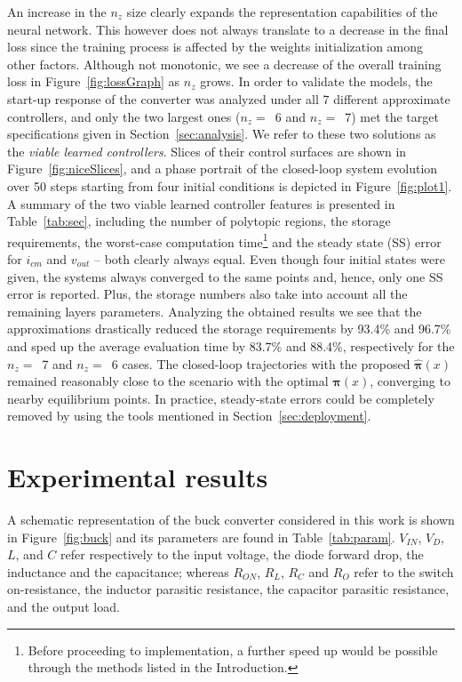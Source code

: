 An increase in the $n_z$ size clearly expands the representation capabilities of the neural network. This however does not always translate to a decrease in the final loss since the training process is affected by the weights initialization among other factors. Although not monotonic, we see a decrease of the overall training loss in Figure~\ref{fig:lossGraph} as $n_z$ grows. In order to validate the models, the start-up response of the converter was analyzed under all 7 different approximate controllers, and only the two largest ones ($n_z=$~6 and $n_z=$~7) met the target specifications given in Section~\ref{sec:analysis}. We refer to these two solutions as the \textit{viable learned controllers}. Slices of their control surfaces are shown in Figure~\ref{fig:niceSlices}, and a phase portrait of the closed-loop system evolution over 50 steps starting from four initial conditions is depicted in Figure~\ref{fig:plot1}. A summary of the two viable learned controller features is presented in Table~\ref{tab:sec}, including the number of polytopic regions, the storage requirements, the worst-case computation time\footnote{Before proceeding to implementation, a further speed up would be possible through the methods listed in the Introduction.} and the steady state (SS) error for $i_{cm}$ and $v_{out}$ -- both clearly always equal. Even though four initial states were given, the systems always converged to the same points and, hence, only one SS error is reported. Plus, the storage numbers also take into account all the remaining layers parameters. Analyzing the obtained results we see that the approximations drastically reduced the storage requirements by 93.4\% and 96.7\% and sped up the average evaluation time by 83.7\% and 88.4\%, respectively for the $n_z=$~7 and $n_z=$~6 cases. The closed-loop trajectories with the proposed $\hat{\bm{\pi}}(x)$ remained reasonably close to the scenario with the optimal $\bm{\pi}(x)$, converging to nearby equilibrium points. In practice, steady-state errors could be completely removed by using the tools mentioned in Section~\ref{sec:deployment}.

\section{Experimental results}


A schematic representation of the buck converter considered in this work is shown in Figure~\ref{fig:buck} and its parameters are found in Table~\ref{tab:param}. $V_{IN}$, $V_D$, $L$, and $C$ refer respectively to the input voltage, the diode forward drop, the inductance and the capacitance; whereas $R_{ON}$, $R_L$, $R_C$ and $R_{O}$ refer to the switch on-resistance, the inductor parasitic resistance, the capacitor parasitic resistance, and the output load.

